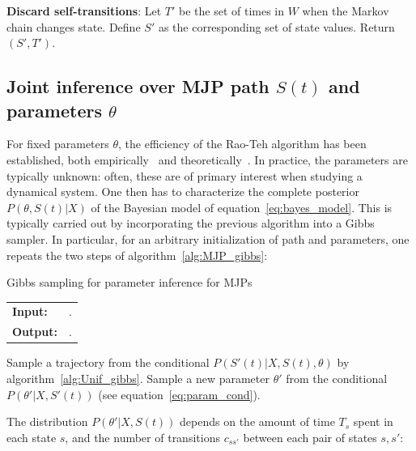 \begin{algorithm}[H]
\begin{algorithmic}[1]
\begin{description}
\end{description}
\State \textbf{Discard self-transitions}: Let $T'$ be the set of times in $W$ when the Markov chain changes state. Define $S'$ as the corresponding set of state values. Return $(S', T')$.
\end{algorithmic}
\end{algorithm}

\subsection{Joint inference over MJP path $S(t)$ and parameters $\theta$}
For fixed parameters $\theta$, the efficiency of the Rao-Teh algorithm has been established, both empirically~\citep{RaoTeh13} and theoretically~\citep{miasojedow2017}.
In practice, the parameters are typically unknown: often, these are of primary interest when studying a dynamical system. 
One then has to characterize the complete posterior $P(\theta, S(t)|X)$ of the Bayesian model of equation~\eqref{eq:bayes_model}. 
This is typically carried out by incorporating the previous algorithm into a Gibbs sampler. 
In particular, for an arbitrary initialization of path and  parameters, one repeats the two steps of algorithm~\ref{alg:MJP_gibbs}:
\begin{algorithm}[H]
  \caption{Gibbs sampling for parameter inference for MJPs}
   \label{alg:MJP_gibbs}
  \begin{tabular}{l l}
   \textbf{Input:  } %
                      & \text{The previous MJP path $S(t) = (S, T)$, the previous MJP parameters $\theta$}.\\ 
   \textbf{Output:  }& \text{New MJP trajectory $S' (t) = (S', T')$ and 
                            parameters $\theta'$}.\\
   \hline
   \end{tabular}
   \begin{algorithmic}[1]
  \State  Sample a trajectory from the conditional 
  $P(S'(t)|X,S(t),\theta)$ by 
  algorithm~\ref{alg:Unif_gibbs}.
  \State Sample a new parameter $\theta'$ from the conditional 
  $P(\theta'|X,S'(t))$ (see equation~\eqref{eq:param_cond}).
   \end{algorithmic}
\end{algorithm} 
The distribution $P(\theta'|X,S(t))$ depends on %
the amount of time $T_s$ spent in each state $s$, and the number of transitions $c_{ss'}$ between each pair of states $s,s'$: 
